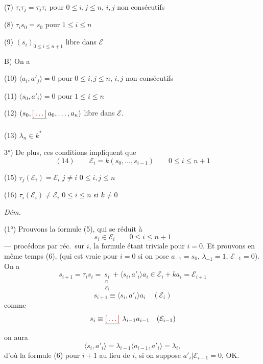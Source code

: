 \documentclass[11pt,a4paper]{article}
\begin{document}
(7) $\tau_i \tau_j = \tau_j \tau_i$ pour $0 \leq i, j \leq n$, $i, j$ non consécutifs

(8) $\tau_i s_0 = s_0$ pour $1 \leq i \leq n$

(9) $(s_i)_{0 \leq i \leq n+1}$ libre dans $\mathcal{E}$

B) On a

(10) $\langle a_i, a'_j \rangle = 0$ \struck{\ill{}} pour $0 \leq i, j \leq n$, $i, j$ non consécutifs

(11) $\langle s_0, a'_i \rangle = 0$ pour $1 \leq i \leq n$

(12) $(s_0, \struck{\ill{}}\, a_0, \dots, a_n)$ libre dans $\mathcal{E}$.

(13) $\lambda_n \in k^*$

3°) De plus, ces conditions impliquent que
\[
(14) \qquad \mathcal{E}_i = k(s_0, \dots, s_{i-1}) \qquad 0 \leq i \leq n+1
\]
\struck{\ill{}}

(15)  $\tau_j(\mathcal{E}_i) = \mathcal{E}_i$ \quad $j \neq i$ \quad $0 \leq i, j \leq n$

(16) $\tau_i(\mathcal{E}_i) \neq \mathcal{E}_i$ \quad $0 \leq i \leq n$ \quad si $k \neq 0$

\emph{Dém.}

(1°) Prouvons la formule (5), qui se réduit à
\[
s_i \in \mathcal{E}_i \qquad 0 \leq i \leq n+1
\]
--- procédons par réc.\ sur $i$, la formule étant triviale pour $i = 0$. Et prouvons en même temps (6), (qui est vraie pour $i = 0$ si on pose $a_{-1} = s_0$, $\lambda_{-1} = 1$, $\mathcal{E}_{-1} = 0$). On a
\[
s_{i+1} = \tau_i s_i = \underset{\substack{\cap \\ \mathcal{E}_i}}{s_i} + \langle s_i, a'_i \rangle a_i \in \mathcal{E}_i + k a_i = \mathcal{E}_{i+1}
\]
\[
s_{i+1} \equiv \langle s_i, a'_i \rangle a_i \quad (\mathcal{E}_i)
\]
comme
\[
s_i \equiv \struck{\ill{}}\ \lambda_{i-1} a_{i-1} \quad (\mathcal{E}_{i-1})
\]
on aura
\[
\langle s_i, a'_i \rangle = \lambda_{i-1} \langle a_{i-1}, a'_i \rangle = \lambda_i ,
\]
d'où la formule (6) pour $i+1$ au lieu de $i$, si on suppose $a'_i | \mathcal{E}_{i-1} = 0$, OK.
\end{document}
